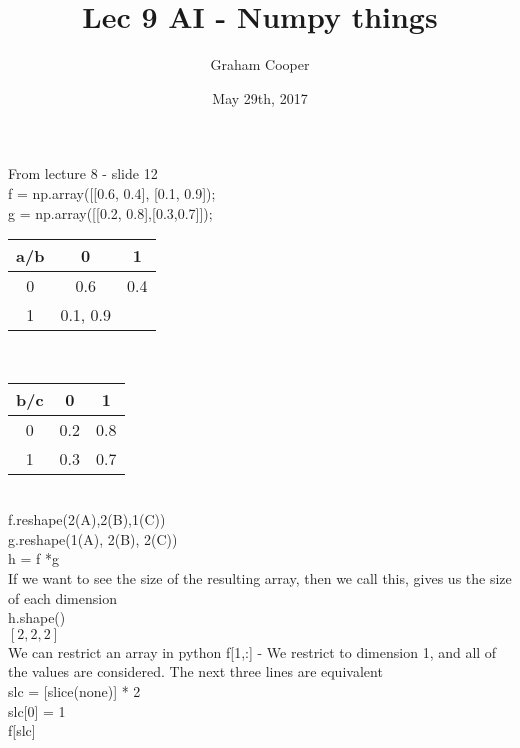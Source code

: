 \documentclass[12pt]{article}
\title{\vspace{-15ex}Lec 9 AI - Numpy things \vspace{-1ex}}
\date{May 29th, 2017}
\author{Graham Cooper}
\begin{document}
	\maketitle
	From lecture 8 - slide 12\\
	
	f = np.array([[0.6, 0.4], [0.1, 0.9]);\\
	g = np.array([[0.2, 0.8],[0.3,0.7]]);
	
	\begin{tabular}{c | c c}
		a/b & 0 & 1 \\ \hline
		0 & 0.6 & 0.4 \\
		1 & 0.1, 0.9
	\end{tabular}\\

	\begin{tabular}{c | c c}
		b/c & 0 & 1 \\ \hline
		0 & 0.2 & 0.8 \\
		1 & 0.3 & 0.7
	\end{tabular}\\

	f.reshape(2(A),2(B),1(C))\\
	g.reshape(1(A), 2(B), 2(C))\\
	h = f *g\\
	
	If we want to see the size of the resulting array, then we call this, gives us the size of each dimension\\
	h.shape()\\
	$[2,2,2]$\\
	
	
	We can restrict an array in python
	f[1,:] - We restrict to dimension 1, and all of the values are considered. The next three lines are equivalent\\
	slc = [slice(none)] * 2\\
	slc[0] = 1\\
	f[slc]\\
	
	
	
\end{document}
